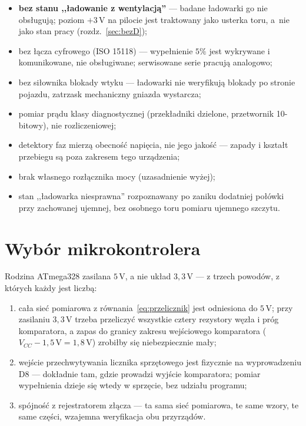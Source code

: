\documentclass[a4paper,11pt]{article}
\newcommand{\volt}{\,\mathrm{V}}
\begin{document}
\begin{itemize}
\item \textbf{bez stanu ,,ładowanie z wentylacją''} --- badane ładowarki go nie
      obsługują; poziom $+3\volt$ na pilocie jest traktowany jako usterka toru,
      a~nie jako stan pracy (rozdz.~\ref{sec:bezD});
\item bez łącza cyfrowego (ISO 15118) --- wypełnienie $5\%$ jest wykrywane
      i komunikowane, nie obsługiwane; serwisowane serie pracują analogowo;
\item bez siłownika blokady wtyku --- ładowarki nie weryfikują blokady po stronie
      pojazdu, zatrzask mechaniczny gniazda wystarcza;
\item pomiar prądu klasy diagnostycznej (przekładniki dzielone, przetwornik
      10-bitowy), nie rozliczeniowej;
\item detektory faz mierzą obecność napięcia, nie jego jakość --- zapady i kształt
      przebiegu są poza zakresem tego urządzenia;
\item brak własnego rozłącznika mocy (uzasadnienie wyżej);
\item stan ,,ładowarka niesprawna'' rozpoznawany po zaniku dodatniej połówki przy
      zachowanej ujemnej, bez osobnego toru pomiaru ujemnego szczytu.
\end{itemize}

\section{Wybór mikrokontrolera}

Rodzina ATmega328 zasilana $5\volt$, a nie układ $3{,}3\volt$ --- z trzech powodów,
z których każdy jest liczbą:

\begin{enumerate}
\item cała sieć pomiarowa z równania~\eqref{eq:przelicznik} jest odniesiona do
      $5\volt$; przy zasilaniu $3{,}3\volt$ trzeba przeliczyć wszystkie cztery
      rezystory węzła i próg komparatora, a zapas do granicy zakresu wejściowego
      komparatora ($V_{CC}-1{,}5\volt = 1{,}8\volt$) zrobiłby się niebezpiecznie
      mały;
\item wejście przechwytywania licznika sprzętowego jest fizycznie na wyprowadzeniu
      D8 --- dokładnie tam, gdzie prowadzi wyjście komparatora; pomiar wypełnienia
      dzieje się wtedy w sprzęcie, bez udziału programu;
\item spójność z rejestratorem złącza --- ta sama sieć pomiarowa, te same wzory,
      te same części, wzajemna weryfikacja obu przyrządów.
\end{enumerate}
\end{document}
